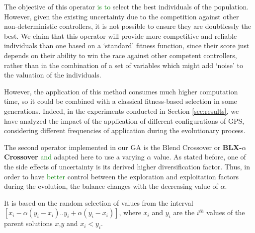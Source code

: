 \documentclass[10pt,journal,compsoc]{IEEEtran}
\begin{document}
The objective of this operator \textcolor{green}{is to} select the best
individuals of the population. However, given the existing uncertainty
\cite{DBLP:journals/tcci/MereloLFGCCRMGTCC16} due to the competition
against other non-deterministic controllers, it is not possible to
ensure they are doubtlessly the best. We claim that this operator will
provide more competitive and reliable individuals than one based on a
`standard' fitness function, since their score just depends on their
ability to win the race against other competent controllers, rather
than in the combination of a set of variables which might add `noise'
to the valuation of the individuals.

However, the application of this method consumes much higher computation time, so it could be combined with a classical fitness-based selection in some generations. Indeed, in the experiments conducted in Section \ref{sec:results}, we have analyzed the impact of the application of different configurations of GPS, considering different frequencies of application during the evolutionary process.

The second operator implemented in our GA is the Blend Crossover or \textbf{BLX-$\alpha$ Crossover} \cite{blx2008} \textcolor{green}{ and} adapted here to use a varying $\alpha$ value. As stated before, one of the side effects of uncertainty is its derived higher diversification factor. Thus, in order to have \textcolor{green}{better} control between the exploration and exploitation factors during the evolution, the balance changes with the decreasing value of $\alpha$.

It is based on the random selection of values from the interval
$[x_i-\alpha(y_i-x_i).. y_i+\alpha(y_i-x_i)]$, where $x_i$ and $y_i$
are the $i^{th}$ values of the parent solutions $x$,$y$ and
$x_i < y_i$. %

\end{document}
